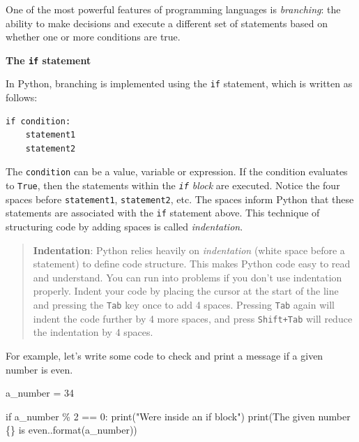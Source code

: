 \documentclass[
  letterpaper,
  DIV=11,
  numbers=noendperiod]{scrreprt}
\newenvironment{Shaded}{\begin{snugshade}}{\end{snugshade}}
\newcommand{\BuiltInTok}[1]{\textcolor[rgb]{0.00,0.23,0.31}{#1}}
\newcommand{\ControlFlowTok}[1]{\textcolor[rgb]{0.00,0.23,0.31}{#1}}
\newcommand{\DecValTok}[1]{\textcolor[rgb]{0.68,0.00,0.00}{#1}}
\newcommand{\NormalTok}[1]{\textcolor[rgb]{0.00,0.23,0.31}{#1}}
\newcommand{\OperatorTok}[1]{\textcolor[rgb]{0.37,0.37,0.37}{#1}}
\newcommand{\SpecialCharTok}[1]{\textcolor[rgb]{0.37,0.37,0.37}{#1}}
\newcommand{\StringTok}[1]{\textcolor[rgb]{0.13,0.47,0.30}{#1}}
\begin{document}
One of the most powerful features of programming languages is
\emph{branching}: the ability to make decisions and execute a different
set of statements based on whether one or more conditions are true.

\textbf{The \texttt{if} statement}

In Python, branching is implemented using the \texttt{if} statement,
which is written as follows:

\begin{verbatim}
if condition:
    statement1
    statement2
\end{verbatim}

The \texttt{condition} can be a value, variable or expression. If the
condition evaluates to \texttt{True}, then the statements within the
\emph{\texttt{if} block} are executed. Notice the four spaces before
\texttt{statement1}, \texttt{statement2}, etc. The spaces inform Python
that these statements are associated with the \texttt{if} statement
above. This technique of structuring code by adding spaces is called
\emph{indentation}.

\begin{quote}
\textbf{Indentation}: Python relies heavily on \emph{indentation} (white
space before a statement) to define code structure. This makes Python
code easy to read and understand. You can run into problems if you don't
use indentation properly. Indent your code by placing the cursor at the
start of the line and pressing the \texttt{Tab} key once to add 4
spaces. Pressing \texttt{Tab} again will indent the code further by 4
more spaces, and press \texttt{Shift+Tab} will reduce the indentation by
4 spaces.
\end{quote}

For example, let's write some code to check and print a message if a
given number is even.

\begin{Shaded}
\begin{Highlighting}[]
\NormalTok{a\_number }\OperatorTok{=} \DecValTok{34}
\end{Highlighting}
\end{Shaded}

\begin{Shaded}
\begin{Highlighting}[]
\ControlFlowTok{if}\NormalTok{ a\_number }\OperatorTok{\%} \DecValTok{2} \OperatorTok{==} \DecValTok{0}\NormalTok{:}
    \BuiltInTok{print}\NormalTok{(}\StringTok{"We\textquotesingle{}re inside an if block"}\NormalTok{)}
    \BuiltInTok{print}\NormalTok{(}\StringTok{\textquotesingle{}The given number }\SpecialCharTok{\{\}}\StringTok{ is even.\textquotesingle{}}\NormalTok{.}\BuiltInTok{format}\NormalTok{(a\_number))}
\end{Highlighting}
\end{Shaded}
\end{document}
